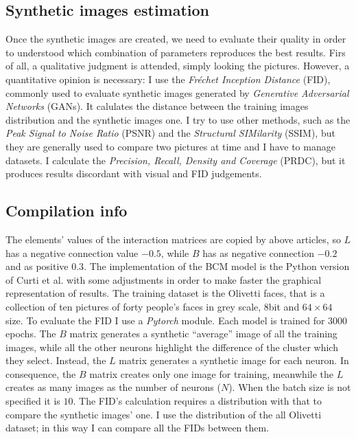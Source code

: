 \documentclass[a4paper,12pt]{article}
\begin{document}
\subsection{Synthetic images estimation}
Once the synthetic images are created, we need to evaluate their quality in order to understood which combination of parameters reproduces the best results.
Firs of all, a qualitative judgment is attended, simply looking the pictures.
However, a quantitative opinion is necessary: I use the \emph{Fréchet Inception Distance} (FID)\cite{heusel:2017}, commonly used to evaluate synthetic images generated by \emph{Generative Adversarial Networks} (GANs).
It calulates the distance between the training images distribution and the synthetic images one.
I try to use other methods, such as the \emph{Peak Signal to Noise Ratio} (PSNR) and the \emph{Structural SIMilarity} (SSIM), but they are generally used to compare two pictures at time and I have to manage datasets.
I calculate the \emph{Precision, Recall, Density and Coverage} (PRDC)\cite{naeem:2020}, but it produces results discordant with visual and FID judgements.

\subsection{Compilation info}
The elements' values of the interaction matrices are copied by above articles, so $L$ has a negative connection value $-0.5$, while $B$ has as negative connection $-0.2$ and as positive $0.3$.
The implementation of the BCM model is the Python version of Curti et al.\cite{curti:2020} with some adjustments in order to make faster the graphical representation of results.
The training dataset is the Olivetti faces, that is a collection of ten pictures of forty people's faces in grey scale, 8bit and $64 \times 64$ size.
To evaluate the FID I use a \emph{Pytorch} module\cite{seitzer:2020}.
Each model is trained for $3000$ epochs.
The $B$ matrix generates a synthetic ``average'' image of all the training images, while all the other neurons highlight the difference of the cluster which they select.
Instead, the $L$ matrix generates a synthetic image for each neuron.
In consequence, the $B$ matrix creates only one image for training, meanwhile the $L$ creates as many images as the number of neurons ($N$).
When the batch size is not specified it is $10$.
The FID's calculation requires a distribution with that to compare the synthetic images' one.
I use the distribution of the all Olivetti dataset; in this way I can compare all the FIDs between them.
\end{document}
